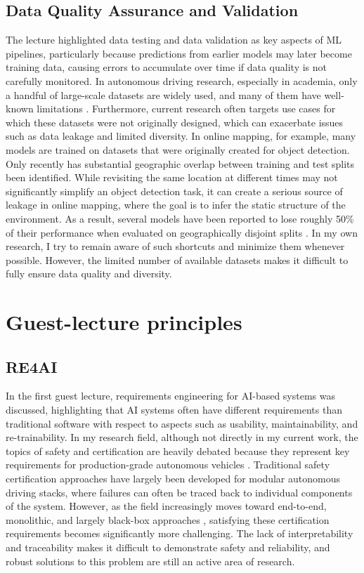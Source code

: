 \documentclass[11pt]{article}
\begin{document}
\subsection{Data Quality Assurance and Validation}
The lecture highlighted data testing and data validation as key aspects of ML pipelines, particularly because predictions from earlier models may later become training data, causing errors to accumulate over time if data quality is not carefully monitored. In autonomous driving research, especially in academia, only a handful of large-scale datasets are widely used, and many of them have well-known limitations \cite{nuscenes, argoverse2, impact}. Furthermore, current research often targets use cases for which these datasets were not originally designed, which can exacerbate issues such as data leakage and limited diversity.
In online mapping, for example, many models are trained on datasets that were originally created for object detection. Only recently has substantial geographic overlap between training and test splits been identified. While revisiting the same location at different times may not significantly simplify an object detection task, it can create a serious source of leakage in online mapping, where the goal is to infer the static structure of the environment. As a result, several models have been reported to lose roughly 50\% of their performance when evaluated on geographically disjoint splits \cite{lilja}. In my own research, I try to remain aware of such shortcuts and minimize them whenever possible. However, the limited number of available datasets makes it difficult to fully ensure data quality and diversity.
\section{Guest-lecture principles}
\subsection{RE4AI}
In the first guest lecture, requirements engineering for AI-based systems was discussed, highlighting that AI systems often have different requirements than traditional software with respect to aspects such as usability, maintainability, and re-trainability. In my research field, although not directly in my current work, the topics of safety and certification are heavily debated because they represent key requirements for production-grade autonomous vehicles \cite{zhao2022certification}. Traditional safety certification approaches have largely been developed for modular autonomous driving stacks, where failures can often be traced back to individual components of the system. However, as the field increasingly moves toward end-to-end, monolithic, and largely black-box approaches \cite{alpamayo, emma}, satisfying these certification requirements becomes significantly more challenging. The lack of interpretability and traceability makes it difficult to demonstrate safety and reliability, and robust solutions to this problem are still an active area of research.
\end{document}
